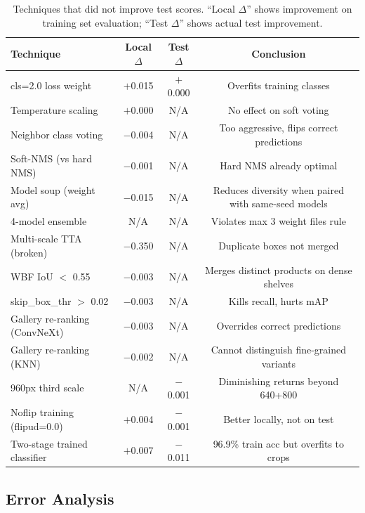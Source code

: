 \documentclass[11pt,a4paper]{article}
\begin{document}
\begin{table}[H]
\centering
\caption{Techniques that did not improve test scores. ``Local $\Delta$'' shows improvement on training set evaluation; ``Test $\Delta$'' shows actual test improvement.}
\label{tab:negative}
\small
\begin{tabular}{@{}lccc@{}}
\toprule
\textbf{Technique} & \textbf{Local $\Delta$} & \textbf{Test $\Delta$} & \textbf{Conclusion} \\
\midrule
cls=2.0 loss weight          & $+$0.015 & $+$0.000 & Overfits training classes \\
Temperature scaling          & $+$0.000 & N/A      & No effect on soft voting \\
Neighbor class voting        & $-$0.004 & N/A      & Too aggressive, flips correct predictions \\
Soft-NMS (vs hard NMS)       & $-$0.001 & N/A      & Hard NMS already optimal \\
Model soup (weight avg)      & $-$0.015 & N/A      & Reduces diversity when paired with same-seed models \\
4-model ensemble             & N/A      & N/A      & Violates max 3 weight files rule \\
Multi-scale TTA (broken)     & $-$0.350 & N/A      & Duplicate boxes not merged \\
WBF IoU $<$ 0.55             & $-$0.003 & N/A      & Merges distinct products on dense shelves \\
skip\_box\_thr $>$ 0.02      & $-$0.003 & N/A      & Kills recall, hurts mAP \\
Gallery re-ranking (ConvNeXt) & $-$0.003 & N/A     & Overrides correct predictions \\
Gallery re-ranking (KNN)     & $-$0.002 & N/A      & Cannot distinguish fine-grained variants \\
960px third scale            & N/A      & $-$0.001 & Diminishing returns beyond 640+800 \\
Noflip training (flipud=0.0) & $+$0.004 & $-$0.001 & Better locally, not on test \\
Two-stage trained classifier & $+$0.007 & $-$0.011 & 96.9\% train acc but overfits to crops \\
\bottomrule
\end{tabular}
\end{table}

\subsection{Error Analysis}
\end{document}
